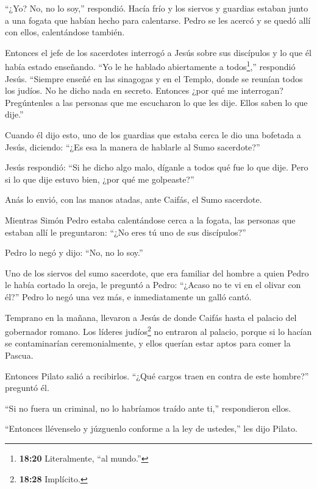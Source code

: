 ``¿Yo? No, no lo soy,'' respondió.  Hacía frío y los
siervos y guardias estaban junto a una fogata que habían hecho para
calentarse. Pedro se les acercó y se quedó allí con ellos, calentándose
también.

 Entonces el jefe de los sacerdotes interrogó a Jesús sobre
sus discípulos y lo que él había estado enseñando.  ``Yo le
he hablado abiertamente a todos\footnote{\textbf{18:20} Literalmente,
  ``al mundo.''},'' respondió Jesús. ``Siempre enseñé en las sinagogas y
en el Templo, donde se reunían todos los judíos. No he dicho nada en
secreto.  Entonces ¿por qué me interrogan? Pregúntenles a
las personas que me escucharon lo que les dije. Ellos saben lo que
dije.''

 Cuando él dijo esto, uno de los guardias que estaba cerca
le dio una bofetada a Jesús, diciendo: ``¿Es esa la manera de hablarle
al Sumo sacerdote?''

 Jesús respondió: ``Si he dicho algo malo, díganle a todos
qué fue lo que dije. Pero si lo que dije estuvo bien, ¿por qué me
golpeaste?''

 Anás lo envió, con las manos atadas, ante Caifás, el Sumo
sacerdote.

 Mientras Simón Pedro estaba calentándose cerca a la
fogata, las personas que estaban allí le preguntaron: ``¿No eres tú uno
de sus discípulos?''

Pedro lo negó y dijo: ``No, no lo soy.''

 Uno de los siervos del sumo sacerdote, que era familiar
del hombre a quien Pedro le había cortado la oreja, le preguntó a Pedro:
``¿Acaso no te vi en el olivar con él?''  Pedro lo negó una
vez más, e inmediatamente un galló cantó.

 Temprano en la mañana, llevaron a Jesús de donde Caifás
hasta el palacio del gobernador romano. Los líderes judíos\footnote{\textbf{18:28}
  Implícito.} no entraron al palacio, porque si lo hacían se
contaminarían ceremonialmente, y ellos querían estar aptos para comer la
Pascua.

 Entonces Pilato salió a recibirlos. ``¿Qué cargos traen en
contra de este hombre?'' preguntó él.

 ``Si no fuera un criminal, no lo habríamos traído ante
ti,'' respondieron ellos.

 ``Entonces llévenselo y júzguenlo conforme a la ley de
ustedes,'' les dijo Pilato.

